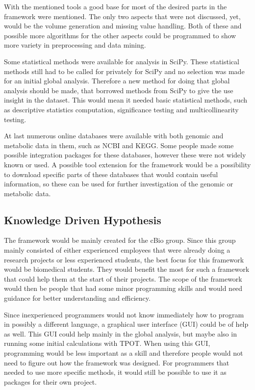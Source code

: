 \documentclass[10pt,a4paper]{article}
\begin{document}
	With the mentioned tools a good base for most of the desired parts in the framework were mentioned. The only two aspects that were not discussed, yet, would be the volume generation and missing value handling. Both of these and possible more algorithms for the other aspects could be programmed to show more variety in preprocessing and data mining.
	
	Some statistical methods were available for analysis in SciPy. These statistical methods still had to be called for privately for SciPy and no selection was made for an initial global analysis. Therefore a new method for doing that global analysis should be made, that borrowed methods from SciPy to give the use insight in the dataset. This would mean it needed basic statistical methods, such as descriptive statistics computation, significance testing and multicollinearity testing. 
	
	At last numerous online databases were available with both genomic and metabolic data in them, such as NCBI and KEGG. Some people made some possible integration packages for these databases, however these were not widely known or used. A possible tool extension for the framework would be a possibility to download specific parts of these databases that would contain useful information, so these can be used for further investigation of the genomic or metabolic data.
	
	\subsection{Knowledge Driven Hypothesis}
	\label{subsec:KnowledgeDrivenHypothesis}
	
	The framework would be mainly created for the cBio group. Since this group mainly consisted of either experienced employees that were already doing a research projects or less experienced students, the best focus for this framework would be biomedical students. They would benefit the most for such a framework that could help them at the start of their projects. The scope of the framework would then be people that had some minor programming skills and would need guidance for better understanding and efficiency.
	
	Since inexperienced programmers would not know immediately how to program in possibly a different language, a graphical user interface (GUI) could be of help as well. This GUI could help mainly in the global analysis, but maybe also in running some initial calculations with TPOT. When using this GUI, programming would be less important as a skill and therefore people would not need to figure out how the framework was designed. For programmers that needed to use more specific methods, it would still be possible to use it as packages for their own project.
	
\end{document}
